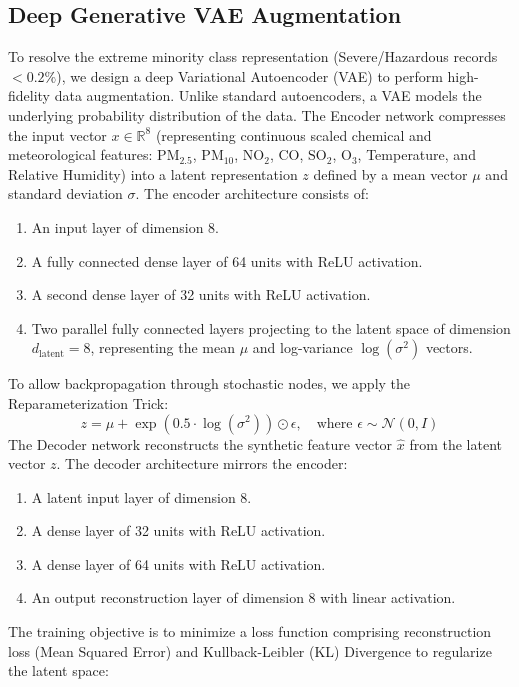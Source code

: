 \documentclass[conference]{IEEEtran}
\begin{document}
\subsection{Deep Generative VAE Augmentation}
To resolve the extreme minority class representation (Severe/Hazardous records $< 0.2\%$), we design a deep Variational Autoencoder (VAE) to perform high-fidelity data augmentation. Unlike standard autoencoders, a VAE models the underlying probability distribution of the data. The Encoder network compresses the input vector $x \in \mathbb{R}^8$ (representing continuous scaled chemical and meteorological features: $\text{PM}_{2.5}$, $\text{PM}_{10}$, $\text{NO}_2$, $\text{CO}$, $\text{SO}_2$, $\text{O}_3$, Temperature, and Relative Humidity) into a latent representation $z$ defined by a mean vector $\mu$ and standard deviation $\sigma$. The encoder architecture consists of:
\begin{enumerate}
\item An input layer of dimension 8.
\item A fully connected dense layer of 64 units with ReLU activation.
\item A second dense layer of 32 units with ReLU activation.
\item Two parallel fully connected layers projecting to the latent space of dimension $d_{\text{latent}} = 8$, representing the mean $\mu$ and log-variance $\log(\sigma^2)$ vectors.
\end{enumerate}
To allow backpropagation through stochastic nodes, we apply the Reparameterization Trick:
\begin{equation}
z = \mu + \exp(0.5 \cdot \log(\sigma^2)) \odot \epsilon, \quad \text{where } \epsilon \sim \mathcal{N}(0, I)
\end{equation}
The Decoder network reconstructs the synthetic feature vector $\hat{x}$ from the latent vector $z$. The decoder architecture mirrors the encoder:
\begin{enumerate}
\item A latent input layer of dimension 8.
\item A dense layer of 32 units with ReLU activation.
\item A dense layer of 64 units with ReLU activation.
\item An output reconstruction layer of dimension 8 with linear activation.
\end{enumerate}
The training objective is to minimize a loss function comprising reconstruction loss (Mean Squared Error) and Kullback-Leibler (KL) Divergence to regularize the latent space:
\end{document}
